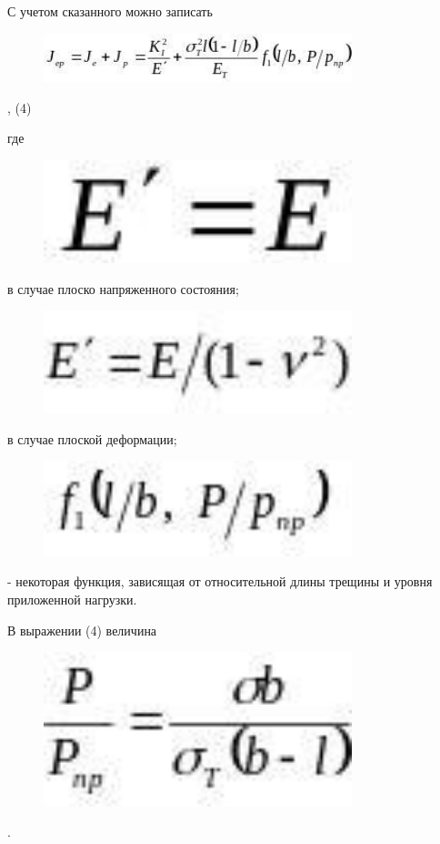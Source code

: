 С учетом сказанного можно записать

\begin{figure}[H]
	\centering
	\includegraphics[width=0.8\textwidth]{assets/1168}
	\caption*{}
\end{figure}, (4)

где \begin{figure}[H]
	\centering
	\includegraphics[width=0.8\textwidth]{assets/1169}
	\caption*{}
\end{figure}в случае плоско напряженного
состояния; \begin{figure}[H]
	\centering
	\includegraphics[width=0.8\textwidth]{assets/1170}
	\caption*{}
\end{figure}в случае плоской
деформации; \begin{figure}[H]
	\centering
	\includegraphics[width=0.8\textwidth]{assets/1171}
	\caption*{}
\end{figure}- некоторая функция,
зависящая от относительной длины трещины и уровня приложенной нагрузки.

В выражении (4) величина

\begin{figure}[H]
	\centering
	\includegraphics[width=0.8\textwidth]{assets/1172}
	\caption*{}
\end{figure}.

